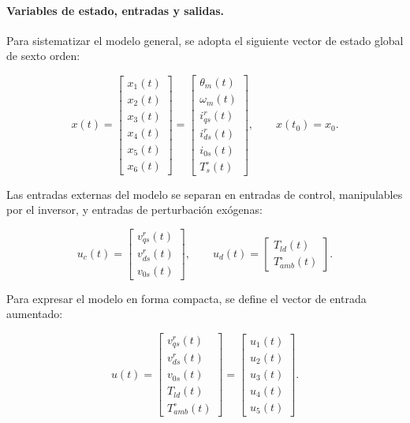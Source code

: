 \documentclass[10pt,a4paper]{article}
\begin{document}
\paragraph{Variables de estado, entradas y salidas.}
Para sistematizar el modelo general, se adopta el siguiente vector de estado global de sexto orden:

\begin{equation}
	x(t)=
	\begin{bmatrix}
		x_1(t)\\
		x_2(t)\\
		x_3(t)\\
		x_4(t)\\
		x_5(t)\\
		x_6(t)
	\end{bmatrix}
	=
	\begin{bmatrix}
		\theta_m(t)\\
		\omega_m(t)\\
		i_{qs}^{r}(t)\\
		i_{ds}^{r}(t)\\
		i_{0s}(t)\\
		T_s^{\circ}(t)
	\end{bmatrix},
	\qquad
	x(t_0)=x_0.
	\label{eq:estado_global_p2}
\end{equation}

Las entradas externas del modelo se separan en entradas de control, manipulables por el inversor, y entradas de perturbación exógenas:

\begin{equation*}
	u_c(t)=\begin{bmatrix}v_{qs}^{r}(t)\\v_{ds}^{r}(t)\\v_{0s}(t)\end{bmatrix},
	\qquad
	u_d(t)=\begin{bmatrix}T_{ld}(t)\\T_{amb}^{\circ}(t)\end{bmatrix}.
\end{equation*}

Para expresar el modelo en forma compacta, se define el vector de entrada aumentado:

\begin{equation}
	u(t)=
	\begin{bmatrix}
		v_{qs}^{r}(t)\\
		v_{ds}^{r}(t)\\
		v_{0s}(t)\\
		T_{ld}(t)\\
		T_{amb}^{\circ}(t)
	\end{bmatrix}
	=
	\begin{bmatrix}
		u_1(t)\\
		u_2(t)\\
		u_3(t)\\
		u_4(t)\\
		u_5(t)
	\end{bmatrix}.
	\label{eq:entradas_global_p2}
\end{equation}
\end{document}
